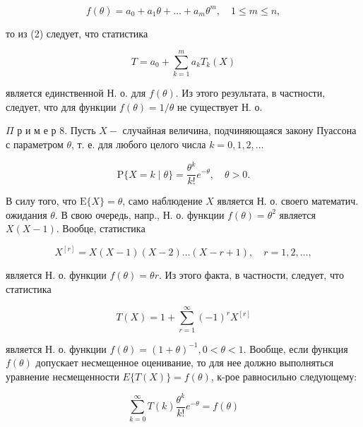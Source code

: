 \documentclass[10pt]{article}
\begin{document}
\[

f(\theta)=a_{0}+a_{1} \theta+\ldots+a_{m} \theta^{m}, \quad 1 \leqslant m \leqslant n,

\]



то из (2) следует, что статистика



\[

T=a_{0}+\sum_{k=1}^{m} a_{k} T_{k}(X)

\]



является единственной Н. о. для $f(\theta)$. Из этого результата, в частности, следует, что для функции $f(\theta)=1 / \theta$ не существует Н. о.



$\Pi$ р и м е р 8. Пусть $X-$ случайная величина, подчиняющаяся закону Пуассона с параметром $\theta$, т. е. для любого целого числа $k=0,1,2, \ldots$



\[

\mathrm{P}\{X=k \mid \theta\}=\frac{\theta^{k}}{k !} e^{-\theta}, \quad \theta>0 .

\]



В силу того, что $\mathrm{E}\{X\}=\theta$, само наблюдение $X$ является Н. о. своего математич. ожидания $\theta$. В свою очередь, напр., Н. о. функции $f(\theta)=\theta^{2}$ является $X(X-1)$. Вообце, статистика



\[

X^{[r]}=X(X-1)(X-2) \ldots(X-r+1), \quad r=1,2, \ldots,

\]



является Н. о. функции $f(\theta)=\theta r$. Из этого факта, в частности, следует, что статистика



\[

T(X)=1+\sum_{r=1}^{\infty}(-1)^{r} X^{[r]}

\]



является Н. о. функции $f(\theta)=(1+\theta)^{-1}, 0<\theta<1$. Вообще, если функция $f(\theta)$ допускает несмещенное оценивание, то для нее должно выполняться уравнение несмещенности $E\{T(X)\}=f(\theta)$, к-рое равносильно следующему:



\[

\sum_{k=0}^{\infty} T(k) \frac{\theta^{k}}{k !} e^{-\theta}=f(\theta)

\]
\end{document}
